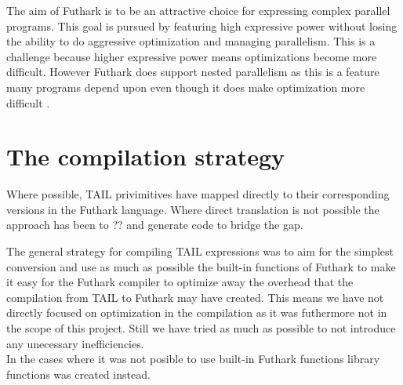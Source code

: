 \documentclass[11pt]{article}
\begin{document}
The aim of Futhark is to be an attractive choice for expressing complex parallel programs.
This goal is pursued by featuring high expressive power without
losing the ability to do aggressive optimization and managing parallelism.
This is a challenge because higher expressive power means optimizations become more difficult. 
However Futhark does support nested parallelism as this is a feature many programs 
depend upon even though it does make optimization more difficult \cite{TroelsHenriksen}.




\section{The compilation strategy}
Where possible, TAIL privimitives have mapped directly to their corresponding versions in the Futhark language.
Where direct translation is not possible the approach has been to ?? and generate code to bridge the gap.



The general strategy for compiling TAIL expressions was to aim for the simplest conversion and use as much as possible 
the built-in functions of Futhark to make it easy for the Futhark compiler to optimize away the overhead that the compilation
from TAIL to Futhark may have created.
This means we have not directly focused on optimization in the compilation as it was futhermore not in the scope of this project.
Still we have tried as much as possible to not introduce any unecessary inefficiencies.\\

In the cases where it was not posible to use built-in Futhark functions library functions was created instead. 
\end{document}
